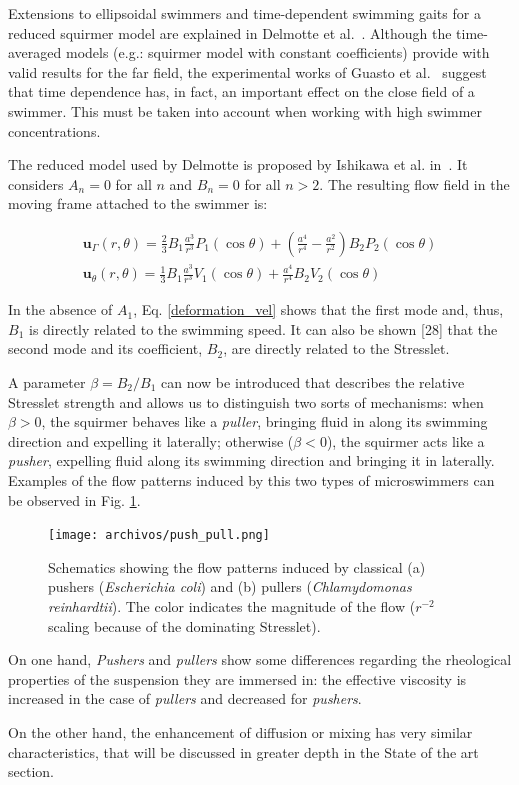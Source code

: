 Extensions to ellipsoidal swimmers and time-dependent swimming gaits for a reduced squirmer model are explained in Delmotte  et al.~\cite{Delmotte2015}. Although the time-averaged models (e.g.: squirmer model with constant coefficients) provide with valid results for the far field, the experimental works of Guasto et al.~\cite{Guasto} suggest that time dependence has, in fact, an important effect on the close field of a swimmer. This must be taken into account when working with high swimmer concentrations.

The reduced model used by Delmotte is proposed by Ishikawa et al. in~\cite{Ishikawa}. It considers $A_n=0$ for all $n$ and $B_n=0$ for all $n >2$. The resulting flow field in the moving frame attached to the swimmer is:

\begin{equation}
\begin{array}{l}{\mathbf{u}_{\Gamma}(r, \theta)=\frac{2}{3} B_{1} \frac{a^{3}}{r^{3}} P_{1}(\cos \theta)+\left(\frac{a^{4}}{r^{4}}-\frac{a^{2}}{r^{2}}\right) B_{2} P_{2}(\cos \theta)} \\ {\mathbf{u}_{\theta}(r, \theta)=\frac{1}{3} B_{1} \frac{a^{3}}{r^{3}} V_{1}(\cos \theta)+\frac{a^{4}}{r^{4}} B_{2} V_{2}(\cos \theta)}\end{array}
\end{equation}

In the absence of $A_1$, Eq. \ref{deformation_vel} shows that the first mode and, thus, $B_1$ is directly related to the swimming speed. It can also be shown [28] that the second mode and its coefficient, $B_2$, are directly related to the Stresslet. 

A parameter $\beta=B_2/B_1$ can now be introduced that describes the relative Stresslet strength and allows us to distinguish two sorts of mechanisms: when $\beta>0$, the squirmer behaves like a \textit{puller}, bringing fluid in along its swimming direction and expelling it laterally; otherwise ($\beta<0$), the squirmer acts like a \textit{pusher}, expelling fluid along  its swimming direction and bringing it in laterally. Examples of the flow patterns induced by this two types of microswimmers can be observed in Fig. \ref{push_pull}.

\begin{figure}[H]
	\centering
	\texttt{[image: archivos/push\_pull.png]}
	\caption{Schematics showing the flow patterns induced by classical (a) pushers (\textit{Escherichia coli}) and (b) pullers (\textit{Chlamydomonas reinhardtii}). The color indicates the magnitude of the flow ($r^{−2}$ scaling because of the dominating Stresslet).~\cite{Yang}}
	\label{push_pull}
\end{figure}

On one hand, \textit{Pushers} and \textit{pullers} show some differences regarding the rheological properties of the suspension they are immersed in: the effective viscosity is increased in the case of \textit{pullers} and decreased for \textit{pushers}.

On the other hand, the enhancement of diffusion or mixing has very similar characteristics, that will be discussed in greater depth in the State of the art section. 